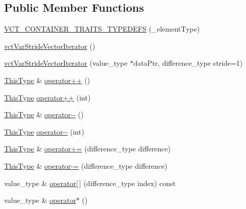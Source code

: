 \subsection*{Public Member Functions}
\begin{DoxyCompactItemize}
\item 
\hyperlink{classvct_var_stride_vector_iterator_adf8cc207f0c088e290ea47d08fb24d2e}{V\+C\+T\+\_\+\+C\+O\+N\+T\+A\+I\+N\+E\+R\+\_\+\+T\+R\+A\+I\+T\+S\+\_\+\+T\+Y\+P\+E\+D\+E\+F\+S} (\+\_\+element\+Type)
\item 
\hyperlink{classvct_var_stride_vector_iterator_af3b7bbb7a0cfb8e7bf3b85b7a951bc10}{vct\+Var\+Stride\+Vector\+Iterator} ()
\item 
\hyperlink{classvct_var_stride_vector_iterator_ae7d26455e71328a58a113385f2a98496}{vct\+Var\+Stride\+Vector\+Iterator} (value\+\_\+type $\ast$data\+Ptr, difference\+\_\+type stride=1)
\item 
\hyperlink{classvct_var_stride_vector_const_iterator_afd99aad7dc756d227f4fb02cd569d00a}{This\+Type} \& \hyperlink{classvct_var_stride_vector_iterator_a09a43ca7a4fd95c025d0ff39b7876334}{operator++} ()
\item 
\hyperlink{classvct_var_stride_vector_const_iterator_afd99aad7dc756d227f4fb02cd569d00a}{This\+Type} \hyperlink{classvct_var_stride_vector_iterator_a06474c8b6ec609c776944db24282d225}{operator++} (int)
\item 
\hyperlink{classvct_var_stride_vector_const_iterator_afd99aad7dc756d227f4fb02cd569d00a}{This\+Type} \& \hyperlink{classvct_var_stride_vector_iterator_a0a0fce130683a0742f48c2a6c9b9528c}{operator-\/-\/} ()
\item 
\hyperlink{classvct_var_stride_vector_const_iterator_afd99aad7dc756d227f4fb02cd569d00a}{This\+Type} \hyperlink{classvct_var_stride_vector_iterator_a20fd7d0ee7d47e6c84e123a6b7e0723c}{operator-\/-\/} (int)
\item 
\hyperlink{classvct_var_stride_vector_const_iterator_afd99aad7dc756d227f4fb02cd569d00a}{This\+Type} \& \hyperlink{classvct_var_stride_vector_iterator_add0300a12f45cfa3ddf55ea294c529fe}{operator+=} (difference\+\_\+type difference)
\item 
\hyperlink{classvct_var_stride_vector_const_iterator_afd99aad7dc756d227f4fb02cd569d00a}{This\+Type} \& \hyperlink{classvct_var_stride_vector_iterator_aa7aa582293555763637360d69df9add0}{operator-\/=} (difference\+\_\+type difference)
\item 
value\+\_\+type \& \hyperlink{classvct_var_stride_vector_iterator_a1a58bcd907b9df2ab275366bf468c0b8}{operator\mbox{[}$\,$\mbox{]}} (difference\+\_\+type index) const 
\item 
value\+\_\+type \& \hyperlink{classvct_var_stride_vector_iterator_a6c32786e298874d71e351bbcdb619873}{operator$\ast$} ()
\end{DoxyCompactItemize}
